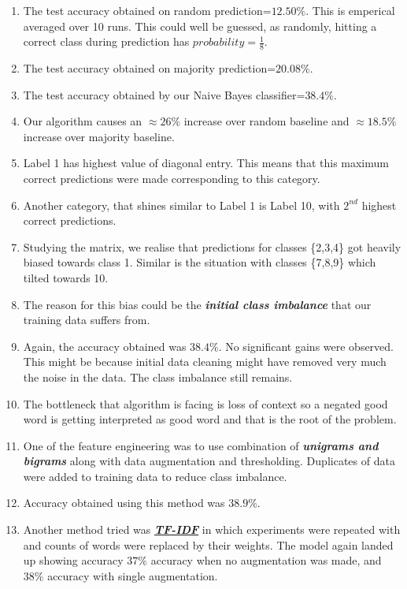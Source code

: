 \documentclass{article}
\newcommand{\italb}[1]{\textbf{\textit{#1}}}
\begin{document}
\begin{enumerate}
\item The test accuracy obtained on random prediction=$12.50\%.$ This is emperical averaged over 10 runs. This could well be guessed, as randomly, hitting a correct class during prediction has $probability=\frac{1}{8}$.
\item The test accuracy obtained on majority prediction=$20.08\%.$
\item The test accuracy obtained by our Naive Bayes classifier=$38.4\%$.
\item Our algorithm causes an $\approx26\%$ increase over random baseline and $\approx18.5\%$ increase over majority baseline.
\item Label 1 has highest value of diagonal entry. This means that this maximum correct predictions were made corresponding to this category.
\item Another category, that shines similar to Label 1 is Label 10, with $2^{nd}$ highest correct predictions.
\item  Studying the matrix, we realise that predictions for classes \{2,3,4\} got heavily biased towards class 1. Similar is the situation with classes \{7,8,9\} which tilted towards 10.
\item The reason for this bias could be the \italb{initial class imbalance} that our training data suffers from. 
\item Again, the accuracy obtained was $38.4\%$. No significant gains were observed. This might be because initial data cleaning might have removed very much the noise in the data. The class imbalance still remains. 
\item The bottleneck that algorithm is facing is loss of context so a negated good word is getting interpreted as good word and that is the root of the problem.
\item One of the feature engineering was to use combination of \italb{unigrams and bigrams} along with data augmentation and thresholding. Duplicates of data were added to training data to reduce class imbalance.
\item Accuracy obtained using this method was $38.9\%$.
\item Another method tried was \href{https://en.wikipedia.org/wiki/Prefix_sum}{\italb{TF-IDF}} in which experiments were repeated with and counts of words were replaced by their weights. The model again landed up showing accuracy $37\%$ accuracy when no augmentation was made, and $38\%$ accuracy with single augmentation.


\end{enumerate}
\end{document}
